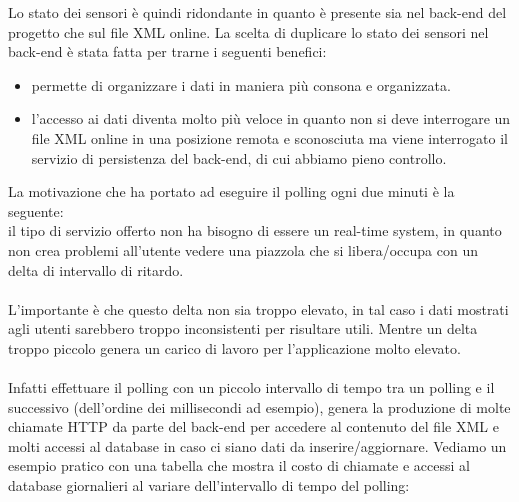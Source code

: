 Lo stato dei sensori è quindi ridondante in quanto è presente sia nel \gls{back-end} del progetto che sul file \gls{XML} online. 
La scelta di duplicare lo stato dei sensori nel \gls{back-end} è stata fatta per trarne i seguenti benefici:
\begin{itemize}
    \item permette di organizzare i dati in maniera più consona e organizzata.
    \item l'accesso ai dati diventa molto più veloce in quanto non si deve interrogare un file \gls{XML} online
        in una posizione remota e sconosciuta ma viene interrogato il servizio di persistenza del \gls{back-end}, 
        di cui abbiamo pieno controllo.
\end{itemize}
\leavevmode\newline
La motivazione che ha portato ad eseguire il polling ogni due minuti è la seguente:
\\
il tipo di servizio offerto non ha bisogno di essere un \gls{real-time system}\glsfirstoccur, in quanto non crea problemi all'utente
vedere una piazzola che si libera/occupa con un delta di intervallo di ritardo. 
\\\\
L'importante è che questo delta non sia troppo elevato, in tal caso i dati mostrati agli utenti sarebbero troppo
inconsistenti per risultare utili. Mentre un delta troppo piccolo genera un carico di lavoro per l'applicazione molto
elevato.
\\\\
Infatti effettuare il polling con un piccolo intervallo di tempo tra un polling e il successivo (dell'ordine dei millisecondi
ad esempio),
genera la produzione di molte 
chiamate \gls{HTTP} da parte del \gls{back-end} per accedere al contenuto del file \gls{XML} e molti accessi al database in caso ci siano dati da 
inserire/aggiornare.
\clearpage
\leavevmode\newline
Vediamo un esempio pratico con una tabella che mostra il costo di chiamate e accessi al database giornalieri al variare 
dell'intervallo di tempo del polling:


